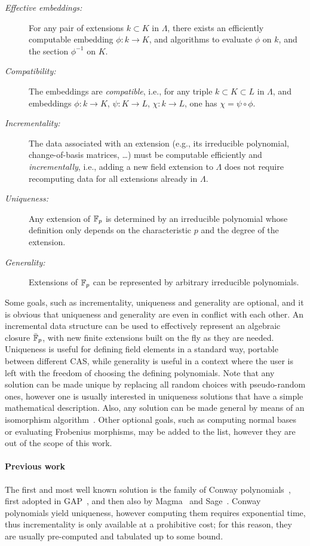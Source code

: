 \documentclass{sig-alternate}
\begin{document}
\begin{description}
\item[\emph{Effective embeddings:}] For any pair of extensions
  $k\subset K$ in $\Lambda$, there exists an efficiently computable
  embedding $\phi:k\to K$, and algorithms to evaluate $\phi$ on $k$,
  and the section $\phi^{-1}$ on $K$.
\item[\emph{Compatibility:}] The embeddings are \emph{compatible},
  i.e., for any triple $k\subset K\subset L$ in $\Lambda$, and
  embeddings $\phi:k\to K$, $\psi:K\to L$, $\chi:k\to L$, one has
  $\chi=\psi\circ\phi$.
\item[\emph{Incrementality:}] The data associated with an extension
  (e.g., its irreducible polynomial, change-of-basis matrices, \dots)
  must be computable efficiently and \emph{incrementally}, i.e.,
  adding a new field extension to $\Lambda$ does not require
  recomputing data for all extensions already in $\Lambda$. %
\item[\emph{Uniqueness:}] Any extension of $\mathbb{F}_p$ is determined by an
  irreducible polynomial whose definition only depends on the
  characteristic $p$ and the degree of the extension. %
\item[\emph{Generality:}] Extensions of $\mathbb{F}_p$ can be represented by
  arbitrary irreducible polynomials.
\end{description}

Some goals, such as incrementality, uniqueness and generality are
optional, and it is obvious that uniqueness and generality are even in
conflict with each other. %
An incremental data structure can be used to effectively represent an
algebraic closure $\bar{\mathbb{F}}_p$, with new finite extensions built on the
fly as they are needed. %
Uniqueness is useful for defining field elements in a standard way,
portable between different CAS, while generality is useful in a
context where the user is left with the freedom of choosing the
defining polynomials. %
Note that any solution can be made unique by replacing all random
choices with pseudo-random ones, however one is usually interested in
uniqueness solutions that have a simple mathematical description. %
Also, any solution can be made general by means of an isomorphism
algorithm~\cite{LenstraJr91,Allombert02,rains2008,brieulle2018computing,narayanan2016fast}. %
Other optional goals, such as computing normal bases or evaluating
Frobenius morphisms, may be added to the list, however they are out of
the scope of this work.

\paragraph{Previous work}
The first and most well known solution is the family of Conway
polynomials~\cite{Nickel1988,heath+loehr99}, first adopted in
GAP~\cite{GAP4}, and then also by Magma~\cite{MAGMA} and
Sage~\cite{Sage}. %
Conway polynomials yield uniqueness, however computing them requires
exponential time, thus incrementality is only available at a
prohibitive cost; for this reason, they are usually pre-computed and
tabulated up to some bound.
\end{document}
